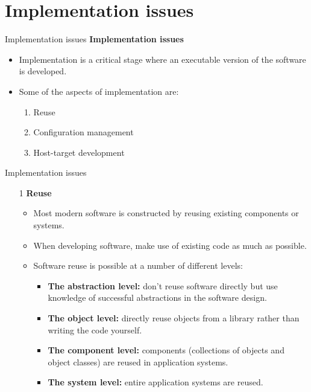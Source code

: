 \documentclass{beamer}
\begin{document}
\section{Implementation issues}
\begin{frame}{Implementation issues}
\textbf{Implementation issues}
\begin{itemize}
	\item Implementation is a critical stage where an executable version of the software is developed.
	\item Some of the aspects of implementation are:

	\begin{enumerate}
		\item Reuse
		\item Configuration management
		\item Host-target development
	\end{enumerate}
\end{itemize}
\end{frame}
\begin{frame}{Implementation issues}
	\begin{itemize}
		\item[1] \textbf{Reuse}
		\begin{itemize}
			\item Most modern software is constructed by reusing existing components or 
			systems. 
			\item When developing software, make use of existing code as much as possible.
			
			\item Software reuse is possible at a number of different levels:
			\begin{itemize}
				\item \textbf{The abstraction level:} don't reuse software directly but use knowledge of successful abstractions in the software design.
				\item \textbf{The object level:} directly reuse objects from a library rather than writing the code yourself.
				\item \textbf{The component level:} components (collections of objects and object classes) are reused in application systems.
				\item \textbf{The system level:} entire application systems are reused.
			\end{itemize}
		\end{itemize} 
	\end{itemize}
\end{frame}
\end{document}
